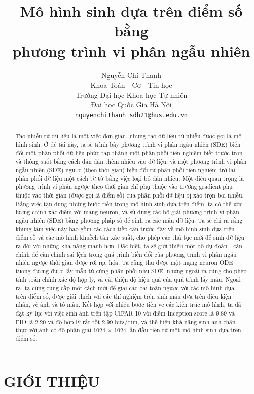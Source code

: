 \documentclass{article} %
\title{Mô hình sinh dựa trên điểm số bằng \\ phương trình vi phân ngẫu nhiên}
\author{Nguyễn Chí Thanh \\
Khoa Toán - Cơ - Tin học\\
Trường Đại học Khoa học Tự nhiên\\
Đại học Quốc Gia Hà Nội \\
\texttt{nguyenchithanh\_sdh21@hus.edu.vn} \\
}
\begin{document}
\maketitle

\begin{abstract}
    Tạo nhiễu từ dữ liệu là một việc đơn giản, nhưng tạo dữ liệu từ nhiễu được gọi là mô hình sinh.
    Ở đề tài này, ta sẽ trình bày phương trình vi phân ngẫu nhiên (SDE) biến đổi một phân phối dữ liệu phức tạp thành một phân phối tiên nghiệm biết trước trơn và thông suốt bằng cách dần dần thêm nhiễu vào dữ liệu,
    và một phương trình vi phân ngẫu nhiên (SDE) ngược (theo thời gian) biến đổi từ phân phối tiên nghiệm trở lại phân phối dữ liệu một cách từ từ bằng việc loại bỏ dần nhiễu.
    Một điều quan trọng là phương trình vi phân ngược theo thời gian chỉ phụ thuộc vào trường gradient phụ thuộc vào thời gian (được gọi là điểm số) của phân phối dữ liệu bị xáo trộn bởi nhiễu.
    Bằng việc tận dụng những bước tiến trong mô hình sinh dựa trên điểm, ta có thể ước lượng chính xác điểm với mạng neuron, và sử dụng các bộ giải phương trình vi phân ngẫu nhiên (SDE) bằng phương pháp số để sinh ra các mẫu dữ liệu.
    Ta sẽ chỉ ra rằng khung làm việc này bao gồm các cách tiếp cận trước đây về mô hình sinh dựa trên điểm số và các mô hình khuếch tán xác suất, cho phép các thủ tục mới để sinh dữ liệu ra đời với những khả năng mạnh hơn.
    Đặc biệt, ta sẽ giới thiệu một bộ dự đoán - căn chỉnh để căn chỉnh sai lệch trong quá trình biến đổi của phương trình vi phân ngẫu nhiên ngược thời gian được rời rạc hóa.
    Ta cũng thu được một mạng neuron ODE tương đương được lấy mẫu từ cùng phân phối như SDE, nhưng ngoài ra cũng cho phép tính toán chính xác độ hợp lý, và cải thiện độ hiệu quả của quá trình lấy mẫu.
    Ngoài ra, ta cũng cung cấp một cách mới để giải các bài toán ngược với các mô hình dựa trên điểm số, được giải thích với các thí nghiệm trên sinh mẫu dựa trên điều kiện nhãn, vẽ ảnh và tô màu.
    Kết hợp với nhiều bước tiến về các kiến trúc mô hình, ta đã đạt kỷ lục với việc sinh ảnh trên tập CIFAR-10 với điểm Inception score là 9.89 và FID là 2.20 và độ hợp lý rất tốt 2.99 bits/dim, và thể hiện khả năng sinh ảnh chân thực với ảnh có độ phân giải 1024 $\times$ 1024 lần đầu tiên từ một mô hình sinh dựa trên điểm số.
\end{abstract}

\section{GIỚI THIỆU}
\end{document}
